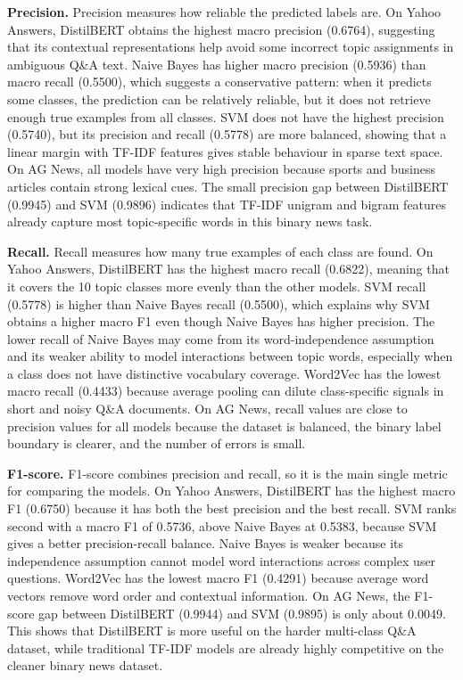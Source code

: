\textbf{Precision.}
Precision measures how reliable the predicted labels are. On Yahoo Answers, DistilBERT obtains the highest macro precision (0.6764), suggesting that its contextual representations help avoid some incorrect topic assignments in ambiguous Q\&A text. Naive Bayes has higher macro precision (0.5936) than macro recall (0.5500), which suggests a conservative pattern: when it predicts some classes, the prediction can be relatively reliable, but it does not retrieve enough true examples from all classes. SVM does not have the highest precision (0.5740), but its precision and recall (0.5778) are more balanced, showing that a linear margin with TF-IDF features gives stable behaviour in sparse text space. On AG News, all models have very high precision because sports and business articles contain strong lexical cues. The small precision gap between DistilBERT (0.9945) and SVM (0.9896) indicates that TF-IDF unigram and bigram features already capture most topic-specific words in this binary news task.

\textbf{Recall.}
Recall measures how many true examples of each class are found. On Yahoo Answers, DistilBERT has the highest macro recall (0.6822), meaning that it covers the 10 topic classes more evenly than the other models. SVM recall (0.5778) is higher than Naive Bayes recall (0.5500), which explains why SVM obtains a higher macro F1 even though Naive Bayes has higher precision. The lower recall of Naive Bayes may come from its word-independence assumption and its weaker ability to model interactions between topic words, especially when a class does not have distinctive vocabulary coverage. Word2Vec has the lowest macro recall (0.4433) because average pooling can dilute class-specific signals in short and noisy Q\&A documents. On AG News, recall values are close to precision values for all models because the dataset is balanced, the binary label boundary is clearer, and the number of errors is small.

\textbf{F1-score.}
F1-score combines precision and recall, so it is the main single metric for comparing the models. On Yahoo Answers, DistilBERT has the highest macro F1 (0.6750) because it has both the best precision and the best recall. SVM ranks second with a macro F1 of 0.5736, above Naive Bayes at 0.5383, because SVM gives a better precision-recall balance. Naive Bayes is weaker because its independence assumption cannot model word interactions across complex user questions. Word2Vec has the lowest macro F1 (0.4291) because average word vectors remove word order and contextual information. On AG News, the F1-score gap between DistilBERT (0.9944) and SVM (0.9895) is only about 0.0049. This shows that DistilBERT is more useful on the harder multi-class Q\&A dataset, while traditional TF-IDF models are already highly competitive on the cleaner binary news dataset.

